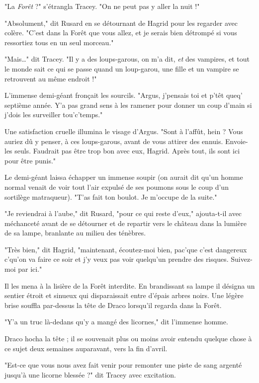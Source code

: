 "La \emph{Forêt}  ?" s'étrangla Tracey. "On ne peut pas y aller la nuit !"

"Absolument," dit Rusard en se détournant de Hagrid pour les regarder avec colère. "C'est dans la Forêt que vous allez, et je serais bien détrompé si vous ressortiez tous en un seul morceau."

"Mais…" dit Tracey. "Il y a des loups-garous, on m'a dit, \emph{et}  des vampires, et tout le monde sait ce qui se passe quand un loup-garou, une fille et un vampire se retrouvent au même endroit !"

L'immense demi-géant fronçait les sourcils. "Argus, j'pensais toi et p'têt queq' septième année. Y'a pas grand sens à les ramener pour donner un coup d'main si j'dois les surveiller tou'c'temps."

Une satisfaction cruelle illumina le visage d'Argus. "Sont à l'affût, hein ? Vous auriez dû y penser, à ces loups-garous, avant de vous attirer des ennuis. Envoie-les seuls. Faudrait pas être trop bon avec eux, Hagrid. Après tout, ils sont ici pour être punis."

Le demi-géant laissa échapper un immense soupir (on aurait dit qu'un homme normal venait de voir tout l'air expulsé de ses poumons sous le coup d'un sortilège matraqueur). "T'as fait ton boulot. Je m'occupe de la suite."

"Je reviendrai à l'aube," dit Rusard, "pour ce qui reste d'eux," ajouta-t-il avec méchanceté avant de se détourner et de repartir vers le château dans la lumière de sa lampe, branlante au milieu des ténèbres.

"Très bien," dit Hagrid, "maintenant, écoutez-moi bien, pac'que c'est dangereux c'qu'on va faire ce soir et j'y veux pas voir quelqu'un prendre des risques. Suivez-moi par ici."

Il les mena à la lisière de la Forêt interdite. En brandissant sa lampe il désigna un sentier étroit et sinueux qui disparaissait entre d'épais arbres noirs. Une légère brise souffla par-dessus la tête de Draco lorsqu'il regarda dans la Forêt.

"Y'a un truc là-dedans qu'y a mangé des licornes," dit l'immense homme.

Draco hocha la tête ; il se souvenait plus ou moins avoir entendu quelque chose à ce sujet deux semaines auparavant, vers la fin d'avril.

"Est-ce que vous nous avez fait venir pour remonter une piste de sang argenté jusqu'à une licorne blessée ?" dit Tracey avec excitation.


